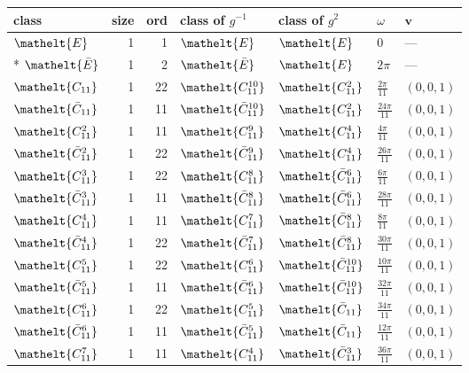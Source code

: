 \documentclass[10pt,a4paper]{article}
\numberwithin{equation}{section}
\newcommand{\eltfont}[1]{{\let\sigma\eltsigma\mathelt{#1}}}
\newcommand{\cls}[1]{\eltfont{#1}}
\newcommand{\dirvec}[3]{(#1, #2, #3)}
\newcommand{\vv}{\mathbf{v}}
\newcommand{\barred}[1]{\bar{#1}}
\begin{document}
{\renewcommand{\arraystretch}{1.3}\begin{longtable}{@{}lrrllll@{}}\toprule
class & size & ord & class of $g^{-1}$ & class of $g^{2}$ & $\omega$ & $\vv$\\\midrule\endhead
\bottomrule\endfoot\endlastfoot
$\cls{E}$ & 1 & 1 & $\cls{E}$ & $\cls{E}$ & $0$ & ---\\*
$\cls{\barred{E}}$ & 1 & 2 & $\cls{\barred{E}}$ & $\cls{E}$ & $2\pi$ & ---\\
$\cls{C_{11}}$ & 1 & 22 & $\cls{C_{11}^{10}}$ & $\cls{C_{11}^{2}}$ & $\tfrac{2\pi}{11}$ & $\dirvec{0}{0}{1}$\\
$\cls{\barred{C}_{11}}$ & 1 & 11 & $\cls{\barred{C}_{11}^{10}}$ & $\cls{C_{11}^{2}}$ & $\tfrac{24\pi}{11}$ & $\dirvec{0}{0}{1}$\\
$\cls{C_{11}^{2}}$ & 1 & 11 & $\cls{C_{11}^{9}}$ & $\cls{C_{11}^{4}}$ & $\tfrac{4\pi}{11}$ & $\dirvec{0}{0}{1}$\\
$\cls{\barred{C}_{11}^{2}}$ & 1 & 22 & $\cls{\barred{C}_{11}^{9}}$ & $\cls{C_{11}^{4}}$ & $\tfrac{26\pi}{11}$ & $\dirvec{0}{0}{1}$\\
$\cls{C_{11}^{3}}$ & 1 & 22 & $\cls{C_{11}^{8}}$ & $\cls{\barred{C}_{11}^{6}}$ & $\tfrac{6\pi}{11}$ & $\dirvec{0}{0}{1}$\\
$\cls{\barred{C}_{11}^{3}}$ & 1 & 11 & $\cls{\barred{C}_{11}^{8}}$ & $\cls{\barred{C}_{11}^{6}}$ & $\tfrac{28\pi}{11}$ & $\dirvec{0}{0}{1}$\\
$\cls{C_{11}^{4}}$ & 1 & 11 & $\cls{C_{11}^{7}}$ & $\cls{\barred{C}_{11}^{8}}$ & $\tfrac{8\pi}{11}$ & $\dirvec{0}{0}{1}$\\
$\cls{\barred{C}_{11}^{4}}$ & 1 & 22 & $\cls{\barred{C}_{11}^{7}}$ & $\cls{\barred{C}_{11}^{8}}$ & $\tfrac{30\pi}{11}$ & $\dirvec{0}{0}{1}$\\
$\cls{C_{11}^{5}}$ & 1 & 22 & $\cls{C_{11}^{6}}$ & $\cls{\barred{C}_{11}^{10}}$ & $\tfrac{10\pi}{11}$ & $\dirvec{0}{0}{1}$\\
$\cls{\barred{C}_{11}^{5}}$ & 1 & 11 & $\cls{\barred{C}_{11}^{6}}$ & $\cls{\barred{C}_{11}^{10}}$ & $\tfrac{32\pi}{11}$ & $\dirvec{0}{0}{1}$\\
$\cls{C_{11}^{6}}$ & 1 & 22 & $\cls{C_{11}^{5}}$ & $\cls{\barred{C}_{11}}$ & $\tfrac{34\pi}{11}$ & $\dirvec{0}{0}{1}$\\
$\cls{\barred{C}_{11}^{6}}$ & 1 & 11 & $\cls{\barred{C}_{11}^{5}}$ & $\cls{\barred{C}_{11}}$ & $\tfrac{12\pi}{11}$ & $\dirvec{0}{0}{1}$\\
$\cls{C_{11}^{7}}$ & 1 & 11 & $\cls{C_{11}^{4}}$ & $\cls{\barred{C}_{11}^{3}}$ & $\tfrac{36\pi}{11}$ & $\dirvec{0}{0}{1}$\\

\end{longtable}}
\end{document}
